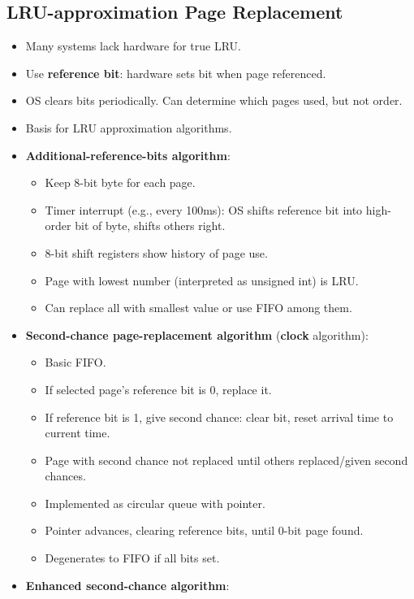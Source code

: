 \subsection{LRU-approximation Page Replacement}
\begin{itemize}
    \item Many systems lack hardware for true LRU.
    \item Use \textbf{reference bit}: hardware sets bit when page referenced.
    \item OS clears bits periodically. Can determine which pages used, but not order.
    \item Basis for LRU approximation algorithms.
    \item \textbf{Additional-reference-bits algorithm}:
    \begin{itemize}
        \item Keep 8-bit byte for each page.
        \item Timer interrupt (e.g., every 100ms): OS shifts reference bit into high-order bit of byte, shifts others right.
        \item 8-bit shift registers show history of page use.
        \item Page with lowest number (interpreted as unsigned int) is LRU.
        \item Can replace all with smallest value or use FIFO among them.
    \end{itemize}
    \item \textbf{Second-chance page-replacement algorithm} (\textbf{clock} algorithm):
    \begin{itemize}
        \item Basic FIFO.
        \item If selected page's reference bit is 0, replace it.
        \item If reference bit is 1, give second chance: clear bit, reset arrival time to current time.
        \item Page with second chance not replaced until others replaced/given second chances.
        \item Implemented as circular queue with pointer.
        \item Pointer advances, clearing reference bits, until 0-bit page found.
        \item Degenerates to FIFO if all bits set.
    \end{itemize}
    \item \textbf{Enhanced second-chance algorithm}:
    \begin{itemize}

\end{itemize}
\end{itemize}
